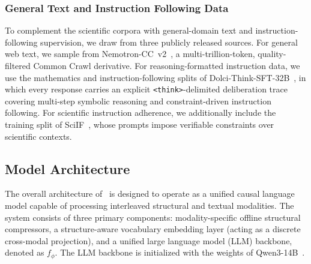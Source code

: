 \subsubsection{General Text and Instruction Following Data}

To complement the scientific corpora with general-domain text and instruction-following supervision, we draw from three publicly released sources. For general web text, we sample from Nemotron-CC~v2~\citep{nvidia2025nvidianemotronnano2}, a multi-trillion-token, quality-filtered Common Crawl derivative. For reasoning-formatted instruction data, we use the mathematics and instruction-following splits of {Dolci-Think-SFT-32B}~\citep{olmo2025olmo3}, in which every response carries an explicit \texttt{<think>}-delimited deliberation trace covering multi-step symbolic reasoning and constraint-driven instruction following. For scientific instruction adherence, we additionally include the training split of {SciIF}~\citep{su2026sciif}, whose prompts impose verifiable constraints over scientific contexts.

 

 

 
 
 
 


\subsection{Model Architecture}
The overall architecture of \projName~is designed to operate as a unified causal language model capable of processing interleaved structural and textual modalities. 
The system consists of three primary components: modality-specific offline structural compressors, a structure-aware vocabulary embedding layer (acting as a discrete cross-modal projection), and a unified large language model (LLM) backbone, denoted as $f_\phi$. 
The LLM backbone is initialized with the weights of Qwen3-14B~\citep{yang2025qwen3}. 
